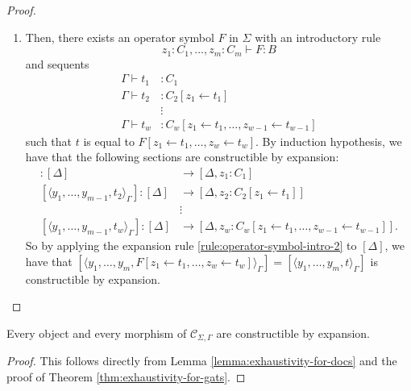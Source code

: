 \begin{proof}
\begin{enumerate}
            And by applying the expansion rule \ref{rule:proof-forall-intro-2} the morphism \[
                [\langle y_1, \dots, y_m, (\forall x \colon B) \rangle_\Gamma] \colon [\Delta] \to [\Delta, x \colon \Prop]
            \] is constructible by expansion.
        \item Then, there exists an operator symbol $F$ in $\Sigma$ with an introductory rule $$z_1 \colon C_1, \dots, z_m \colon C_m \vdash F \colon B$$ and sequents 
            \begin{align*}
                \Gamma \vdash t_1 &\colon C_1 \\
                \Gamma \vdash t_2 &\colon C_2[z_1 \leftarrow t_1] \\
                &\vdots \\
                \Gamma \vdash t_w &\colon C_w[z_1 \leftarrow t_1, \dots, z_{w-1} \leftarrow t_{w-1}]
            \end{align*}
            such that $t$ is equal to $F[z_1 \leftarrow t_1, \dots, z_w \leftarrow t_w]$.
            By induction hypothesis, we have that the following sections are constructible by expansion:
            \begin{align*}
                [\langle y_1, \dots, y_{m-1}, t_1 \rangle_\Gamma] \colon [\Delta] &\to [\Delta, z_1 \colon C_1] \\
                [\langle y_1, \dots, y_{m-1}, t_2 \rangle_\Gamma] \colon [\Delta] &\to [\Delta, z_2 \colon C_2[z_1 \leftarrow t_1]] \\
                & \vdots \\
                [\langle y_1, \dots, y_{m-1}, t_w \rangle_\Gamma] \colon [\Delta] &\to [\Delta, z_w \colon C_w[z_1 \leftarrow t_1, \dots, z_{w-1} \leftarrow t_{w-1}]].
            \end{align*}
            So by applying the expansion rule \ref{rule:operator-symbol-intro-2} to $[\Delta]$, we have that
            $[\langle y_1, \dots, y_m, F[z_1 \leftarrow t_1, \dots, z_w \leftarrow t_w] \rangle_\Gamma] = [\langle y_1, \dots, y_m, t \rangle_\Gamma]$ 
            is constructible by expansion. \qedhere
    \end{enumerate}         
\end{proof}

\begin{theorem} \label{thm:exhaustivity-for-docs}
    Every object and every morphism of $\mathcal{C}_{\Sigma, \Gamma}$ are constructible by expansion.
\end{theorem}
\begin{proof} 
    This follows directly from Lemma \ref{lemma:exhaustivity-for-docs} and the proof of Theorem \ref{thm:exhaustivity-for-gats}.
\end{proof}